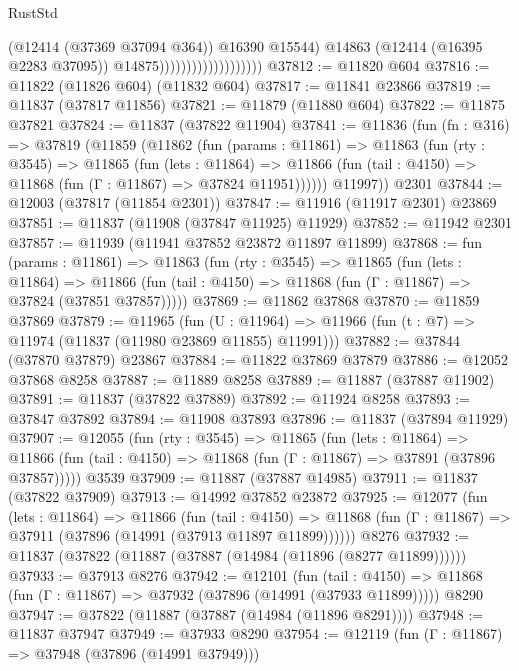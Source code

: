 \begin{lexlean}{RustStd}
\begin{coremodule}
                                            (@12414 (@37369 @37094 @364))
                                            @16390
                                            @15544)
                                          @14863
                                          (@12414 (@16395 @2283 @37095))
                                          @14875)))))))))))))))))))
@37812 := @11820 @604
@37816 := @11822 (@11826 @604) (@11832 @604)
@37817 := @11841 @23866
@37819 := @11837 (@37817 @11856)
@37821 := @11879 (@11880 @604)
@37822 := @11875 @37821
@37824 := @11837 (@37822 @11904)
@37841 := @11836
    (fun (fn : @316) =>
    @37819
      (@11859
        (@11862
          (fun (params : @11861) =>
          @11863
            (fun (rty : @3545) =>
            @11865
              (fun (lets : @11864) =>
              @11866 (fun (tail : @4150) => @11868 (fun (Γ : @11867) => @37824 @11951))))))
        @11997))
    @2301
@37844 := @12003 (@37817 (@11854 @2301))
@37847 := @11916 (@11917 @2301) @23869
@37851 := @11837 (@11908 (@37847 @11925) @11929)
@37852 := @11942 @2301
@37857 := @11939 (@11941 @37852 @23872 @11897 @11899)
@37868 := fun (params : @11861) =>
  @11863
    (fun (rty : @3545) =>
    @11865
      (fun (lets : @11864) =>
      @11866 (fun (tail : @4150) => @11868 (fun (Γ : @11867) => @37824 (@37851 @37857)))))
@37869 := @11862 @37868
@37870 := @11859 @37869
@37879 := @11965
    (fun (U : @11964) => @11966 (fun (t : @7) => @11974 (@11837 (@11980 @23869 @11855) @11991)))
@37882 := @37844 (@37870 @37879) @23867
@37884 := @11822 @37869 @37879
@37886 := @12052 @37868 @8258
@37887 := @11889 @8258
@37889 := @11887 (@37887 @11902)
@37891 := @11837 (@37822 @37889)
@37892 := @11924 @8258
@37893 := @37847 @37892
@37894 := @11908 @37893
@37896 := @11837 (@37894 @11929)
@37907 := @12055
    (fun (rty : @3545) =>
    @11865
      (fun (lets : @11864) =>
      @11866 (fun (tail : @4150) => @11868 (fun (Γ : @11867) => @37891 (@37896 @37857)))))
    @3539
@37909 := @11887 (@37887 @14985)
@37911 := @11837 (@37822 @37909)
@37913 := @14992 @37852 @23872
@37925 := @12077
    (fun (lets : @11864) =>
    @11866
      (fun (tail : @4150) =>
      @11868 (fun (Γ : @11867) => @37911 (@37896 (@14991 (@37913 @11897 @11899))))))
    @8276
@37932 := @11837 (@37822 (@11887 (@37887 (@14984 (@11896 (@8277 @11899))))))
@37933 := @37913 @8276
@37942 := @12101
    (fun (tail : @4150) => @11868 (fun (Γ : @11867) => @37932 (@37896 (@14991 (@37933 @11899)))))
    @8290
@37947 := @37822 (@11887 (@37887 (@14984 (@11896 @8291))))
@37948 := @11837 @37947
@37949 := @37933 @8290
@37954 := @12119 (fun (Γ : @11867) => @37948 (@37896 (@14991 @37949)))

\end{coremodule}
\end{lexlean}
